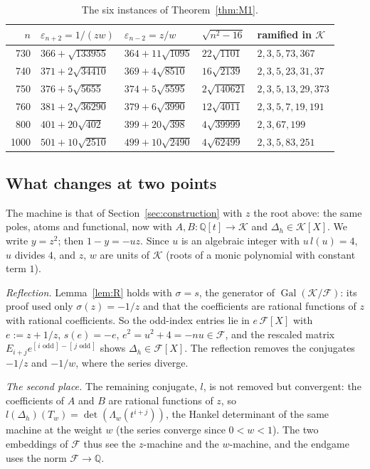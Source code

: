 \documentclass[11pt]{amsart}
\theoremstyle{definition}
\theoremstyle{remark}
\numberwithin{equation}{section}
\newcommand{\QQ}{\mathbb{Q}}
\newcommand{\cK}{\mathcal{K}}
\newcommand{\cF}{\mathcal{F}}
\newcommand{\eps}{\varepsilon}
\newcommand{\ind}[1]{[\,#1\,]}
\begin{document}
\begin{table}[ht]
\centering\small
\begin{tabular}{@{}rllll@{}}
\toprule
$n$ & $\eps_{n+2}=1/(zw)$ & $\eps_{n-2}=z/w$ & $\sqrt{n^2-16}$ & ramified in $\cK$\\
\midrule
730 & $366+\sqrt{133955}$ & $364+11\sqrt{1095}$ & $22\sqrt{1101}$ & $2,3,5,73,367$\\
740 & $371+2\sqrt{34410}$ & $369+4\sqrt{8510}$ & $16\sqrt{2139}$ & $2,3,5,23,31,37$\\
750 & $376+5\sqrt{5655}$ & $374+5\sqrt{5595}$ & $2\sqrt{140621}$ & $2,3,5,13,29,373$\\
760 & $381+2\sqrt{36290}$ & $379+6\sqrt{3990}$ & $12\sqrt{4011}$ & $2,3,5,7,19,191$\\
800 & $401+20\sqrt{402}$ & $399+20\sqrt{398}$ & $4\sqrt{39999}$ & $2,3,67,199$\\
1000 & $501+10\sqrt{2510}$ & $499+10\sqrt{2490}$ & $4\sqrt{62499}$ & $2,3,5,83,251$\\
\bottomrule
\end{tabular}
\caption{The six instances of Theorem~\ref{thm:M1}.}\label{tab:M1fields}
\end{table}

\subsection{What changes at two points}
The machine is that of Section~\ref{sec:construction} with $z$ the root above: the same poles, atoms and functional,
now with $A,B\colon\QQ[t]\to\cK$ and $\Delta_h\in\cK[X]$. We write $y=z^2$; then $1-y=-uz$. Since $u$ is an algebraic integer
with $u\,l(u)=4$, $u$ divides $4$, and $z$, $w$ are units of $\cK$ (roots of a monic polynomial with constant term $1$).

\emph{Reflection.} Lemma~\ref{lem:R} holds with $\sigma=s$, the generator of $\operatorname{Gal}(\cK/\cF)$: its proof
used only $\sigma(z)=-1/z$ and that the coefficients are rational functions of $z$ with rational coefficients. So the
odd-index entries lie in $e\,\cF[X]$ with $e:=z+1/z$, $s(e)=-e$, $e^2=u^2+4=-nu\in\cF$, and the rescaled matrix
$E_{i+j}e^{\ind{i\text{ odd}}-\ind{j\text{ odd}}}$ shows $\Delta_h\in\cF[X]$. The reflection removes the conjugates
$-1/z$ and $-1/w$, where the series diverge.

\emph{The second place.} The remaining conjugate, $l$, is not removed but convergent: the coefficients of $A$ and $B$
are rational functions of $z$, so $l(\Delta_h)(T_w)=\det(\Lambda_w(t^{i+j}))$, the Hankel determinant of the same
machine at the weight $w$ (the series converge since $0<w<1$). The two embeddings of $\cF$ thus see the $z$-machine and
the $w$-machine, and the endgame uses the norm $\cF\to\QQ$.
\end{document}
